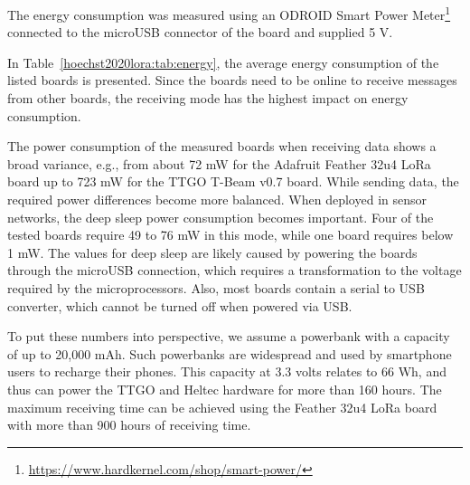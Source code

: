 The energy consumption was measured using an ODROID Smart Power Meter\footnote{\url{https://www.hardkernel.com/shop/smart-power/}} connected to the microUSB connector of the board and supplied 5 V.

In Table~\ref{hoechst2020lora:tab:energy}, the average energy consumption of the listed boards is presented. 
Since the boards need to be online to receive messages from other boards, the receiving mode has the highest impact on energy consumption.

The power consumption of the measured boards when receiving data shows a broad variance, e.g., from about 72 mW for the Adafruit Feather 32u4 LoRa board up to 723 mW for the TTGO T-Beam v0.7 board.
While sending data, the required power differences become more balanced.
When deployed in sensor networks, the deep sleep power consumption becomes important. 
Four of the tested boards require 49 to 76 mW in this mode, while one board requires below 1 mW.
The values for deep sleep are likely caused by powering the boards through the microUSB connection, which requires a transformation to the voltage required by the microprocessors. 
Also, most boards contain a serial to USB converter, which cannot be turned off when powered via USB.

To put these numbers into perspective, we assume a powerbank with a capacity of up to 20,000 mAh. Such powerbanks are widespread and used by smartphone users to recharge their phones. 
This capacity at 3.3 volts relates to 66 Wh, and thus can power the TTGO and Heltec hardware for more than 160 hours. 
The maximum receiving time can be achieved using the Feather 32u4 LoRa board with more than 900 hours of receiving time.
